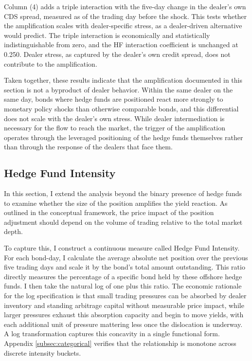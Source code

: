 \documentclass[english, 11pt, oneside]{article}
\begin{document}
Column (4) adds a triple interaction with the five-day change in the dealer's own CDS spread, measured as of the trading day before the shock. This tests whether the amplification scales with dealer-specific stress, as a dealer-driven alternative would predict. The triple interaction is economically and statistically indistinguishable from zero, and the HF interaction coefficient is unchanged at 0.250. Dealer stress, as captured by the dealer's own credit spread, does not contribute to the amplification.

Taken together, these results indicate that the amplification documented in this section is not a byproduct of dealer behavior. Within the same dealer on the same day, bonds where hedge funds are positioned react more strongly to monetary policy shocks than otherwise comparable bonds, and this differential does not scale with the dealer's own stress. While dealer intermediation is necessary for the flow to reach the market, the trigger of the amplification operates through the leveraged positioning of the hedge funds themselves rather than through the response of the dealers that face them.


\subsection{Hedge Fund Intensity}
In this section, I extend the analysis beyond the binary presence of hedge funds to examine whether the size of the position amplifies the yield reaction. As outlined in the conceptual framework, the price impact of the position adjustment should depend on the volume of trading relative to the total market depth.

To capture this, I construct a continuous measure called Hedge Fund Intensity. For each bond-day, I calculate the average absolute net position over the previous five trading days and scale it by the bond's total amount outstanding. This ratio directly measures the percentage of a specific bond held by these offshore hedge funds. I then take the natural log of one plus this ratio. The economic rationale for the log specification is that small trading pressures can be absorbed by dealer inventory and standing arbitrage capital without measurable price impact, while larger pressures exhaust this absorption capacity and begin to move yields, with each additional unit of pressure mattering less once the dislocation is underway. A log transformation captures this concavity in a single functional form. Appendix \ref{subsec:categorical} verifies that the relationship is monotone across discrete intensity buckets.
\end{document}
